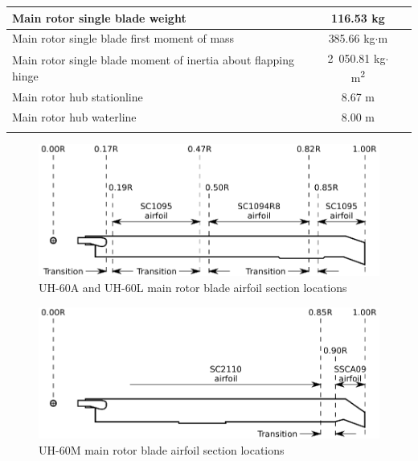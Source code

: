 \begin{tabularx}{\textwidth}{ | L | c | c | }
  Main rotor single blade weight        & 116.53 kg        & \cite{NASA-CR-166309} \\ \hline
  Main rotor single blade first moment of mass & 385.66 kg$\cdot$m & \cite{NASA-CR-166309} \\ \hline
  Main rotor single blade moment of inertia about flapping hinge & 2~050.81 kg$\cdot$m\textsuperscript{2} & \cite{NASA-CR-166309} \\ \hline
  Main rotor hub stationline            & 8.67 m           & \cite{UH60_MaintenanceManual} \\ \hline
  Main rotor hub waterline              & 8.00 m           & \cite{UH60_MaintenanceManual} \\ \hline
  \caption{Main rotor data}
\end{tabularx}

\clearpage

\begin{figure}[p]
  \centering
  \includegraphics[width=120mm]{eps/uh60_blade_1.eps}
  \caption{UH-60A and UH-60L main rotor blade airfoil section locations \cite{NASA-TM-103985}}
\end{figure}

\begin{figure}[p]
  \centering
  \includegraphics[width=120mm]{eps/uh60_blade_2.eps}
  \caption{UH-60M main rotor blade airfoil section locations \cite{YeoBousmanJohnson2004}}
\end{figure}


